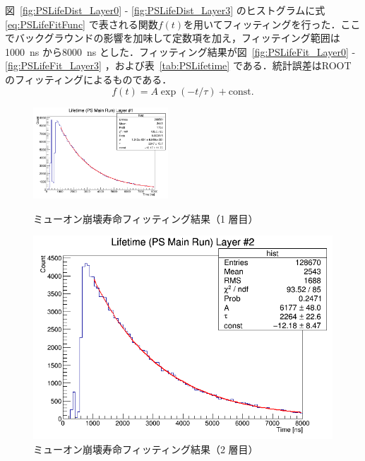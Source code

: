 図~\ref{fig:PSLifeDist_Layer0} - \ref{fig:PSLifeDist_Layer3} のヒストグラムに式\eqref{eq:PSLifeFitFunc} で表される関数$f(t)$を用いてフィッティングを行った．ここでバックグラウンドの影響を加味して定数項を加え，フィッテイング範囲は1000~ns から8000~ns とした．フィッティング結果が図~\ref{fig:PSLifeFit_Layer0} - \ref{fig:PSLifeFit_Layer3} ，および表~\ref{tab:PSLifetime} である．統計誤差はROOT のフィッティングによるものである．
\begin{equation}
f(t) = A \exp(-t / \tau) + \mathrm{const.}
\label{eq:PSLifeFitFunc}
\end{equation}

\begin{figure}[h]
	\centering
	\includegraphics[width = 0.45\textwidth]{figure/odagawa/PSLifetimeFit_Layer0.png}
	\caption{ミューオン崩壊寿命フィッティング結果（1 層目）}
	\label{fig:PSLifeFit_Layer0}
	\begin{minipage}{0.45\textwidth}
	\centering
	\includegraphics[width = \textwidth]{figure/odagawa/PSLifetimeFit_Layer1.png}
	\caption{ミューオン崩壊寿命フィッティング結果（2 層目）}
	\label{fig:PSLifeFit_Layer1}
	\end{minipage}
	\begin{minipage}{0.45\textwidth}
	\centering

\end{minipage}
\end{figure}
